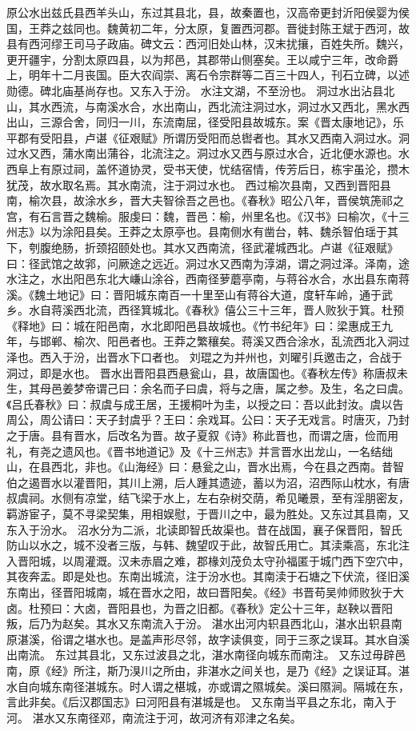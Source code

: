 \documentclass[12pt,UTF8]{ctexbook}
\begin{document}
原公水出兹氏县西羊头山，东过其县北，县，故秦置也，汉高帝更封沂阳侯婴为侯国，王莽之兹同也。魏黄初二年，分太原，复置西河郡。晋徙封陈王斌于西河，故县有西河缪王司马子政庙。碑文云：西河旧处山林，汉末扰攘，百姓失所。魏兴，更开疆宇，分割太原四县，以为邦邑，其郡带山侧塞矣。王以咸宁三年，改命爵上，明年十二月丧国。臣大农阎崇、离石令宗群等二百三十四人，刊石立碑，以述勋德。碑北庙基尚存也。又东入于汾。
水注文湖，不至汾也。
洞过水出沾县北山，其水西流，与南溪水合，水出南山，西北流注洞过水，洞过水又西北，黑水西出山，三源合舍，同归一川，东流南屈，径受阳县故城东。案《晋太康地记》，乐平郡有受阳县，卢谌《征艰赋》所谓历受阳而总辔者也。其水又西南入洞过水。洞过水又西，蒲水南出蒲谷，北流注之。洞过水又西与原过水合，近北便水源也。水西阜上有原过祠，盖怀道协灵，受书天使，忧结宿情，传芳后日，栋宇虽沦，攒木犹茂，故水取名焉。其水南流，注于洞过水也。
西过榆次县南，又西到晋阳县南，榆次县，故涂水乡，晋大夫智徐吾之邑也。《春秋》昭公八年，晋侯筑箎祁之宫，有石言晋之魏榆。服虔曰：魏，晋邑：榆，州里名也。《汉书》曰榆次，《十三州志》以为涂阳县矣。王莽之太原亭也。县南侧水有凿台，韩、魏杀智伯瑶于其下，刳腹绝肠，折颈招颐处也。其水又西南流，径武灌城西北。卢谌《征艰赋》曰：径武馆之故郛，问厥途之远近。洞过水又西南为淳湖，谓之洞过泽。泽南，途水注之，水出阳邑东北大嵰山涂谷，西南径萝蘑亭南，与蒋谷水合，水出县东南蒋溪。《魏土地记》曰：晋阳城东南百一十里至山有蒋谷大道，度轩车岭，通于武乡。水自蒋溪西北流，西径箕城北。《春秋》僖公三十三年，晋人败狄于箕。杜预《释地》曰：城在阳邑南，水北即阳邑县故城也。《竹书纪年》曰：梁惠成王九年，与邯郸、榆次、阳邑者也。王莽之繁穰矣。蒋溪又西合涂水，乱流西北入洞过泽也。西入于汾，出晋水下口者也。
刘琨之为并州也，刘曜引兵邀击之，合战于洞过，即是水也。
晋水出晋阳县西悬瓮山，县，故唐国也。《春秋左传》称唐叔未生，其母邑姜梦帝谓己曰：余名而子曰虞，将与之唐，属之参。及生，名之曰虞。《吕氏春秋》曰：叔虞与成王居，王援桐叶为圭，以授之曰：吾以此封汝。虞以告周公，周公请曰：天子封虞乎？王曰：余戏耳。公曰：天子无戏言。时唐灭，乃封之于唐。县有晋水，后改名为晋。故子夏叙《诗》称此晋也，而谓之唐，俭而用礼，有尧之遗风也。《晋书地道记》及《十三州志》并言晋水出龙山，一名结绌山，在县西北，非也。《山海经》曰：悬瓮之山，晋水出焉，今在县之西南。昔智伯之遏晋水以灌晋阳，其川上溯，后人踵其遗迹，蓄以为沼，沼西际山枕水，有唐叔虞祠。水侧有凉堂，结飞梁于水上，左右杂树交荫，希见曦景，至有淫朋密友，羁游宦子，莫不寻梁契集，用相娱慰，于晋川之中，最为胜处。又东过其县南，又东入于汾水。
沼水分为二派，北读即智氏故渠也。昔在战国，襄子保晋阳，智氏防山以水之，城不没者三版，与韩、魏望叹于此，故智氏用亡。其渎乘高，东北注入晋阳城，以周灌溉。汉未赤眉之难，郡椽刘茂负太守孙福匿于城门西下空穴中，其夜奔盂。即是处也。东南出城流，注于汾水也。其南渎于石塘之下伏流，径旧溪东南出，径晋阳城南，城在晋水之阳，故曰晋阳矣。《经》书晋苟吴帅师败狄于大卤。杜预曰：大卤，晋阳县也，为晋之旧都。《春秋》定公十三年，赵鞅以晋阳叛，后乃为赵矣。其水又东南流入于汾。
湛水出河内轵县西北山，湛水出轵县南原湛溪，俗谓之堪水也。是盖声形尽邻，故字读俱变，同于三豕之误耳。其水自溪出南流。
东过其县北，又东过波县之北，湛水南径向城东而南注。
又东过毋辟邑南，原《经》所注，斯乃湨川之所由，非湛水之间关也，是乃《经》之误证耳。湛水自向城东南径湛城东。时人谓之椹城，亦或谓之隰城矣。溪曰隰涧。隔城在东，言此非矣。《后汉郡国志》曰河阳县有湛城是也。
又东南当平县之东北，南入于河。
湛水又东南径邓，南流注于河，故河济有邓津之名矣。
\end{document}
